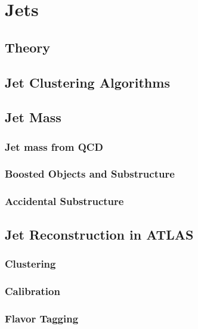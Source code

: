 \chapter{Jets}
\section{Theory}
\section{Jet Clustering Algorithms}
\section{Jet Mass}
\subsection{Jet mass from QCD}
\subsection{Boosted Objects and Substructure}
\subsection{Accidental Substructure}
\section{Jet Reconstruction in ATLAS}
\subsection{Clustering}
\subsection{Calibration}
\subsection{Flavor Tagging}